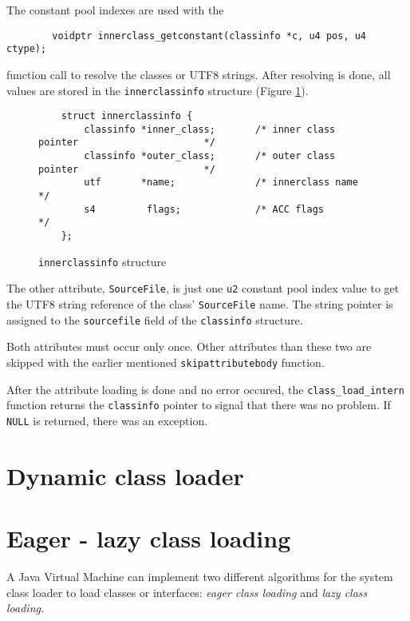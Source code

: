 The constant pool indexes are used with the

\begin{verbatim}
        voidptr innerclass_getconstant(classinfo *c, u4 pos, u4 ctype);
\end{verbatim}

function call to resolve the classes or UTF8 strings. After resolving
is done, all values are stored in the \texttt{innerclassinfo}
structure (Figure \ref{innerclassinfostructure}).

\begin{figure}[h]
\begin{verbatim}
    struct innerclassinfo {
        classinfo *inner_class;       /* inner class pointer                      */
        classinfo *outer_class;       /* outer class pointer                      */
        utf       *name;              /* innerclass name                          */
        s4         flags;             /* ACC flags                                */
    };
\end{verbatim}
\caption{\texttt{innerclassinfo} structure}
\label{innerclassinfostructure}
\end{figure}

The other attribute, \texttt{SourceFile}, is just one \texttt{u2}
constant pool index value to get the UTF8 string reference of the
class' \texttt{SourceFile} name. The string pointer is assigned to the
\texttt{sourcefile} field of the \texttt{classinfo} structure.

Both attributes must occur only once. Other attributes than these two
are skipped with the earlier mentioned \texttt{skipattributebody}
function.

After the attribute loading is done and no error occured, the
\texttt{class\_load\_intern} function returns the \texttt{classinfo}
pointer to signal that there was no problem. If \texttt{NULL} is
returned, there was an exception.


\section{Dynamic class loader}


\section{Eager - lazy class loading}

A Java Virtual Machine can implement two different algorithms for the
system class loader to load classes or interfaces: \textit{eager class
loading} and \textit{lazy class loading}.


